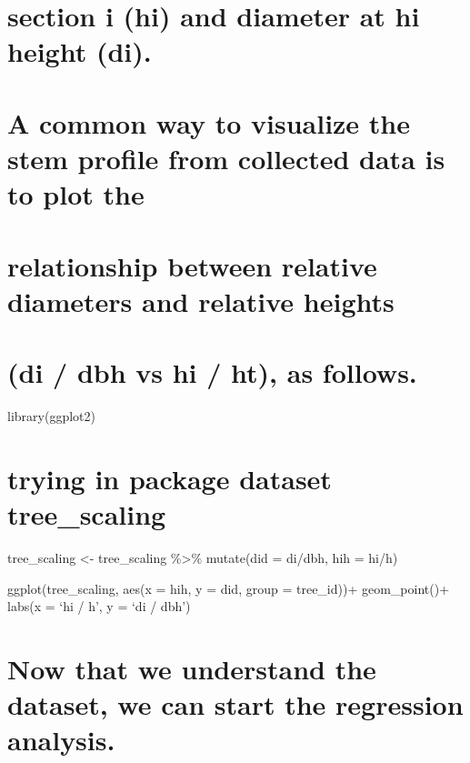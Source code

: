 \documentclass[
]{article}
\begin{document}
\hypertarget{section-i-hi-and-diameter-at-hi-height-di.}{%
\section{section i (hi) and diameter at hi height
(di).}\label{section-i-hi-and-diameter-at-hi-height-di.}}

\hypertarget{a-common-way-to-visualize-the-stem-profile-from-collected-data-is-to-plot-the}{%
\section{A common way to visualize the stem profile from collected data
is to plot
the}\label{a-common-way-to-visualize-the-stem-profile-from-collected-data-is-to-plot-the}}

\hypertarget{relationship-between-relative-diameters-and-relative-heights}{%
\section{relationship between relative diameters and relative
heights}\label{relationship-between-relative-diameters-and-relative-heights}}

\hypertarget{di-dbh-vs-hi-ht-as-follows.}{%
\section{(di / dbh vs hi / ht), as
follows.}\label{di-dbh-vs-hi-ht-as-follows.}}

library(ggplot2)

\hypertarget{trying-in-package-dataset-tree_scaling}{%
\section{trying in package dataset
tree\_scaling}\label{trying-in-package-dataset-tree_scaling}}

tree\_scaling \textless- tree\_scaling \%\textgreater\% mutate(did =
di/dbh, hih = hi/h)

ggplot(tree\_scaling, aes(x = hih, y = did, group = tree\_id))+
geom\_point()+ labs(x = `hi / h', y = `di / dbh')

\hypertarget{now-that-we-understand-the-dataset-we-can-start-the-regression-analysis.}{%
\section{Now that we understand the dataset, we can start the regression
analysis.}\label{now-that-we-understand-the-dataset-we-can-start-the-regression-analysis.}}
\end{document}
